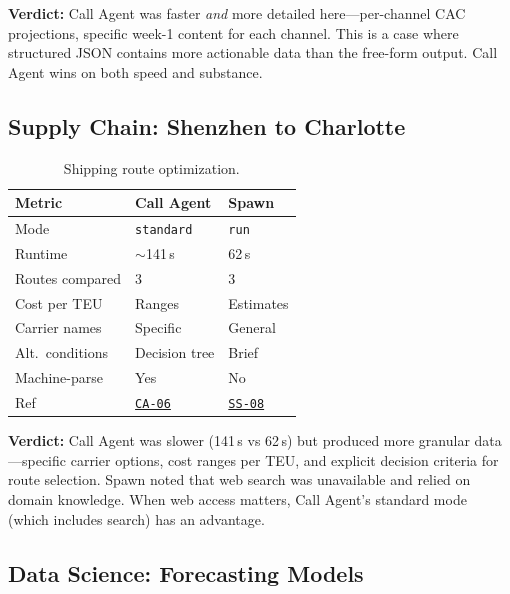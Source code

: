 \documentclass[11pt,twocolumn]{article}
\newcommand{\win}[1]{\cellcolor{winner}#1}
\newcommand{\lose}[1]{\cellcolor{loser}#1}
\newcommand{\tie}[1]{\cellcolor{tied}#1}
\newcommand{\ghbase}{https://github.com/agenticmail/agenticmail/blob/main/research/agent-rpc-vs-spawn}
\begin{document}
\textbf{Verdict:} Call Agent was faster \emph{and} more detailed here---per-channel CAC projections, specific week-1 content for each channel. This is a case where structured JSON contains more actionable data than the free-form output. Call Agent wins on both speed and substance.

\subsection{Supply Chain: Shenzhen to Charlotte}

\begin{table}[H]
\centering
\caption{Shipping route optimization.}
\begin{tabular}{@{}p{2.2cm}p{2.1cm}p{2.1cm}@{}}
\toprule
\textbf{Metric} & \textbf{Call Agent} & \textbf{Spawn} \\
\midrule
Mode & \texttt{standard} & \texttt{run} \\
Runtime & \lose{$\sim$141\,s} & \win{62\,s} \\
Routes compared & \tie{3} & \tie{3} \\
Cost per TEU & \win{Ranges} & Estimates \\
Carrier names & \win{Specific} & General \\
Alt.\ conditions & \win{Decision tree} & Brief \\
Machine-parse & \win{Yes} & \lose{No} \\
Ref & \href{\ghbase/results-callagent/06-supply-chain-standard.md}{\texttt{CA-06}} & \href{\ghbase/results/08-supply-chain.md}{\texttt{SS-08}} \\
\bottomrule
\end{tabular}
\end{table}

\textbf{Verdict:} Call Agent was slower (141\,s vs 62\,s) but produced more granular data---specific carrier options, cost ranges per TEU, and explicit decision criteria for route selection. Spawn noted that web search was unavailable and relied on domain knowledge. When web access matters, Call Agent's standard mode (which includes search) has an advantage.

\subsection{Data Science: Forecasting Models}
\end{document}
